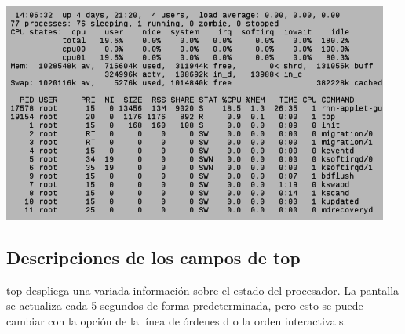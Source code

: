 \documentclass[12pt]{article}
\begin{document}
\begin{center}
 \includegraphics{top.png}
\end{center}

\subsection{Descripciones de los campos de top}
       top  despliega  una variada información sobre el estado del procesador.
       La pantalla se actualiza cada 5 segundos de forma predeterminada,  pero
       esto se puede cambiar con la opción de la línea de órdenes d o la orden
       interactiva s.
\end{document}
